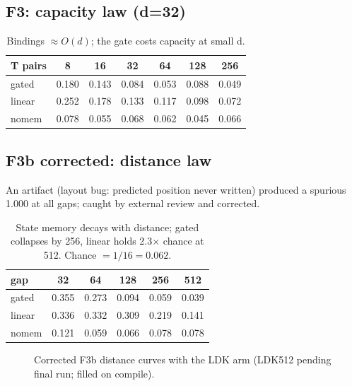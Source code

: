 \documentclass[11pt]{article}
\begin{document}
\subsection{F3: capacity law (d=32)}
\begin{table}[H]\centering\small
\begin{tabular}{lcccccc}
\toprule
T pairs & 8 & 16 & 32 & 64 & 128 & 256 \\
\midrule
gated & 0.180 & 0.143 & 0.084 & 0.053 & 0.088 & 0.049 \\
linear & 0.252 & 0.178 & 0.133 & 0.117 & 0.098 & 0.072 \\
nomem & 0.078 & 0.055 & 0.068 & 0.062 & 0.045 & 0.066 \\
\bottomrule
\end{tabular}
\caption{Bindings $\approx O(d)$; the gate costs capacity at small d.}
\end{table}

\subsection{F3b corrected: distance law}
An artifact (layout bug: predicted position never written) produced a
spurious 1.000 at all gaps; caught by external review and corrected.
\begin{table}[H]\centering\small
\begin{tabular}{lccccc}
\toprule
gap & 32 & 64 & 128 & 256 & 512 \\
\midrule
gated & 0.355 & 0.273 & 0.094 & 0.059 & 0.039 \\
linear & 0.336 & 0.332 & 0.309 & 0.219 & 0.141 \\
nomem & 0.121 & 0.059 & 0.066 & 0.078 & 0.078 \\
\bottomrule
\end{tabular}
\caption{State memory decays with distance; gated collapses by 256,
linear holds 2.3$\times$ chance at 512. Chance $=1/16=0.062$.}
\end{table}

\begin{figure}[H]\centering
{}
\caption{Corrected F3b distance curves with the LDK arm (LDK512 pending
final run; filled on compile).}
\end{figure}
\end{document}
